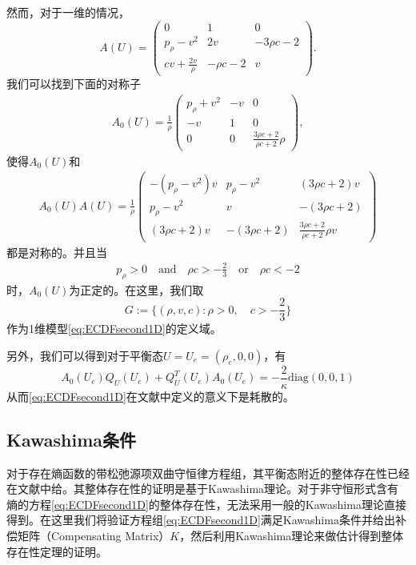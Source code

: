 然而，对于一维的情况，
\begin{equation*}
	A(U) = \left( \begin{array}{ccc}
		0 & 1 & 0 \\
		p_\rho - v^2 & 2v & -3 \rho c - 2 \\
		cv + \frac{2 v}{\rho} & -  \rho c - 2 & v 
	\end{array}\right).
\end{equation*}
我们可以找到下面的对称子
\begin{eqnarray}\label{31}
A_0(U) = \frac{1}{\rho} \left( \begin{array}{ccc}
	 p_\rho  +v^2 & -v & 0 \\ [2mm]
	-v & 1 & 0 \\[2mm]
	0 & 0 & \frac{3\rho c+2}{\rho c+2}\rho  \end{array} \right),
\end{eqnarray}
使得$A_0(U)$和
\begin{eqnarray*}
A_0(U) A(U) = \frac{1}{\rho} \left( \begin{array}{ccc}
		-(p_{\rho}-v^2)v & {p_\rho -v^2} & {(3\rho c + 2)v} \\[2mm]
		{p_\rho-v^2} & {v} & -{(3 \rho c+2)} \\[2mm]
		{(3 \rho c+ 2)v} & -{(3 \rho c+2)} & \frac{3\rho c+2}{\rho c + 2}\rho v
		\end{array} \right)
\end{eqnarray*}
都是对称的。并且当
\begin{eqnarray*}
p_\rho > 0 \quad \mbox{and} \quad \rho c > -\frac{2}{3} \quad \mbox{or} \quad  \rho c < -2 
\end{eqnarray*}
时，$A_0(U)$为正定的。在这里，我们取
\begin{equation}\label{37}
G := \{(\rho, v, c): \rho>0, \quad c> - \frac{2}{3}\}
\end{equation}
作为1维模型\eqref{eq:ECDFsecond1D}的定义域。

另外，我们可以得到对于平衡态$U=U_e = (\rho_e,0,0)$，有
\begin{equation}\label{32}
A_0(U_e)Q_U(U_e) + Q_U^T(U_e)A_0(U_e) =-\frac{2}{\kappa}\mbox{diag}(0, 0, 1)
\end{equation}
从而\eqref{eq:ECDFsecond1D}在文献\cite{yong1992singular,yong1999singular}中定义的意义下是耗散的。

\subsection{Kawashima条件}
对于存在熵函数的带松弛源项双曲守恒律方程组，其平衡态附近的整体存在性已经在文献\cite{yong2004entropy,hanouzet2003global}中给。其整体存在性的证明是基于Kawashima理论。对于非守恒形式含有熵的方程\eqref{eq:ECDFsecond1D}的整体存在性，无法采用一般的Kawashima理论直接得到。在这里我们将验证方程组\eqref{eq:ECDFsecond1D}满足Kawashima条件并给出补偿矩阵（Compensating Matrix）$K$\cite{kawashima1985systems}，然后利用Kawashima理论来做估计得到整体存在性定理的证明。

